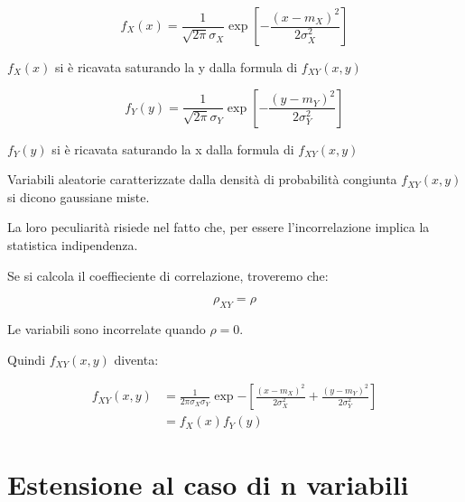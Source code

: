 {
    \Large 
    \begin{equation}
        f_X (x) = 
        \frac{1}{\sqrt{2 \pi} \sigma_X}
        \exp[-\frac{(x-m_X)^{2}}{2 \sigma_X ^{2}}]
    \end{equation}
}

$f_X (x)$ si è ricavata saturando la y dalla formula di $f_{XY} (x, y)$

{
    \Large 
    \begin{equation}
        f_Y (y) = 
        \frac{1}{\sqrt{2 \pi} \sigma_Y}
        \exp[-\frac{(y-m_Y)^{2}}{2 \sigma_Y ^{2}}]
    \end{equation}
}

$f_Y (y)$ si è ricavata saturando la x dalla formula di $f_{XY} (x, y)$

Variabili aleatorie caratterizzate dalla densità di probabilità congiunta $f_{XY} (x, y)$ 
si dicono gaussiane miste. \newline 

La loro peculiarità risiede nel fatto che, per essere l'incorrelazione implica la statistica indipendenza. \newline 

Se si calcola il coeffieciente di correlazione, troveremo che: 

{
    \Large 
    \begin{equation}
        \rho_{XY} = \rho
    \end{equation}
}

Le variabili sono incorrelate quando $\rho = 0$. \newline 


Quindi $f_{XY} (x, y)$ diventa: 

{
    \Large 
    \begin{equation}
        \begin{split}
            f_{XY} (x, y) 
            &=
            \frac{1}{2 \pi \sigma_X \sigma_Y}
            \exp{-[\frac{(x - m_X)^{2}}{2 \sigma_X ^{2}} + \frac{(y - m_Y)^{2}}{2 \sigma_Y ^{2}}]}
            \\
            &= 
            f_X (x) f_Y (y)
        \end{split}
    \end{equation}
}


\newpage 

\section{Estensione al caso di n variabili}

